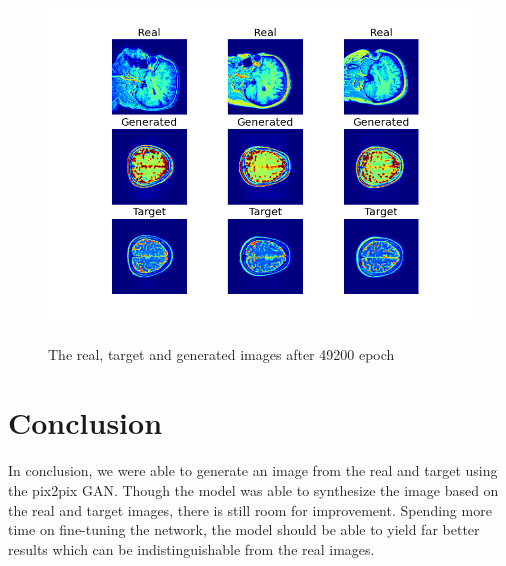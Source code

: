 \documentclass[conference]{IEEEtran}
\begin{document}
\begin{figure}[H]
    \centering
    \includegraphics[width=0.95\columnwidth]{plot_049200.png}
    \label{fig:epoch49200}
    \caption{The real, target and generated images after 49200 epoch}
\end{figure}

\section*{Conclusion}

In conclusion, we were able to generate an image from the real and target using the pix2pix GAN. Though the model was able to synthesize the image based on the real and target images, there is still room for improvement. Spending more time on fine-tuning the network, the model should be able to yield far better results which can be indistinguishable from the real images. 

 


\end{document}
